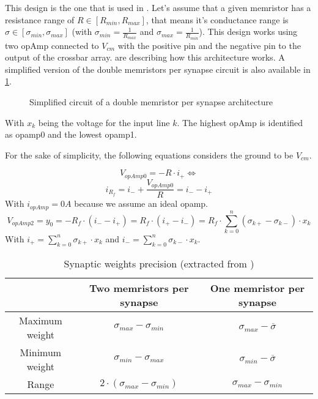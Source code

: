 This design is the one that is used in \cite{doubleMem}. Let's assume that a given memristor has a resistance range of $R\in[R_{min},R_{max}]$, that means it's conductance range is $\sigma \in [\sigma_{min},\sigma_{max}]$ (with $\sigma_{min}= \frac{1}{R_{max}}$ and $\sigma_{max}= \frac{1}{R_{min}}$). This design works using two \ac{opAmp} connected to $V_{cm}$ with the positive pin and the negative pin to the output of the crossbar array.  are describing how this architecture works. A simplified version of the double memristors per synapse circuit is also available in \cref{circt:doubleMem}.

\begin{figure}[H]
  \centering
  
  \caption{Simplified circuit of a double memristor per synapse architecture}
  \label{circt:doubleMem}
\end{figure}

With $x_k$ being the voltage for the input line $k$. The highest \ac{opAmp} is identified as opamp0 and the lowest opamp1.

For the sake of simplicity, the following equations considers the ground to be $V_{cm}$.

\begin{equation}
  \label{eq:doubleMem0}
  V_{opAmp0}=-R\cdot i_+ \Leftrightarrow
\end{equation}
\begin{equation}
  \label{eq:doubleMem1}
  i_{R_f}=i_-+\frac{V_{opAmp0}}{R}=i_--i_+
\end{equation}
With $i_{opAmp}=0A$ because we assume an ideal \ac{opamp}.
\begin{equation}
  \label{eq:doubleMem2}
  V_{opAmp2}=y_0=-R_f\cdot(i_--i_+)=R_f\cdot(i_+-i_-)=R_f\cdot\sum_{k=0}^n(\sigma_{k+}-\sigma_{k-})\cdot x_k
\end{equation}
With $i_+=\sum_{k=0}^n\sigma_{k+}\cdot x_k$ and $i_-=\sum_{k=0}^n\sigma_{k-}\cdot x_k$.


\begin{table}[H]
  \centering
  \begin{tabular}{|c|c|c|}
    \cline{2-3}
    \rowcolor{gray}
    \multicolumn{1}{c|}{\cellcolor[HTML]{FFFFFF}} & Two memristors per synapse & One memristor per synapse \\
    \hline
    Maximum weight & $\sigma_{max}-\sigma_{min}$ & $\sigma_{max} -\overline{\sigma}$\\
    \hline
    Minimum weight & $\sigma_{min}-\sigma_{max}$ & $\sigma_{min} -\overline{\sigma}$\\
    \hline
    Range & $2\cdot(\sigma_{max}-\sigma_{min})$&$\sigma_{max}-\sigma_{min}$\\
    \hline
  \end{tabular}
  \caption{Synaptic weights precision (extracted from \cite{doubleMem})}
  \label{tab:synapses}
\end{table}


